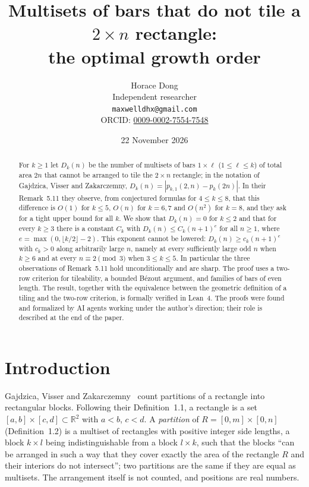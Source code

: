 \documentclass[11pt]{article}
\title{Multisets of bars that do not tile a $2\times n$ rectangle:\\ the optimal growth order}
\author{Horace Dong\\ \small Independent researcher\\
\small\texttt{maxwelldhx@gmail.com}\\
\small ORCID: \href{https://orcid.org/0009-0002-7554-7548}{0009-0002-7554-7548}}
\date{22 November 2026}
\theoremstyle{definition}
\theoremstyle{remark}
\begin{document}
\maketitle

\begin{abstract}
For $k\ge1$ let $D_k(n)$ be the number of multisets of bars $1\times\ell$
($1\le\ell\le k$) of total area $2n$ that cannot be arranged to tile the
$2\times n$ rectangle; in the notation of Gajdzica, Visser and Zakarczemny,
$D_k(n)=|p_{k,1}(2,n)-p_k(2n)|$. In their Remark~5.11 they observe, from
conjectured formulas for $4\le k\le 8$, that this difference is $O(1)$ for
$k\le5$, $O(n)$ for $k=6,7$ and $O(n^2)$ for $k=8$, and they ask for a tight
upper bound for all $k$. We show that $D_k(n)=0$ for $k\le2$ and that for
every $k\ge3$ there is a constant $C_k$ with $D_k(n)\le C_k(n+1)^{e}$ for all
$n\ge1$, where $e=\max(0,\lfloor k/2\rfloor-2)$. This exponent cannot be
lowered: $D_k(n)\ge c_k(n+1)^e$ with $c_k>0$ along arbitrarily large $n$, namely
at every sufficiently large odd $n$ when $k\ge6$ and at every $n\equiv2\pmod 3$
when $3\le k\le5$. In particular the three observations of Remark~5.11 hold
unconditionally and are sharp. The proof uses a two-row criterion for
tileability, a bounded Bézout argument, and families of bars of even length.
The result, together with the equivalence between the geometric definition
of a tiling and the two-row criterion, is formally verified in Lean~4. The
proofs were found and formalized by AI agents working under the author's
direction; their role is described at the end of the paper.
\end{abstract}

\section{Introduction}

Gajdzica, Visser and Zakarczemny~\cite{gvz} count partitions of a rectangle
into rectangular blocks. Following their Definition~1.1, a rectangle is a set
$[a,b]\times[c,d]\subset\mathbb R^2$ with $a<b$, $c<d$. A \emph{partition} of
$R=[0,m]\times[0,n]$ (Definition~1.2) is a multiset of rectangles with
positive integer side lengths, a block $k\times l$ being indistinguishable from
a block $l\times k$, such that the blocks ``can be arranged in such a way that
they cover exactly the area of the rectangle $R$ and their interiors do not
intersect''; two partitions are the same if they are equal as multisets. The
arrangement itself is not counted, and positions are real numbers.
\end{document}
